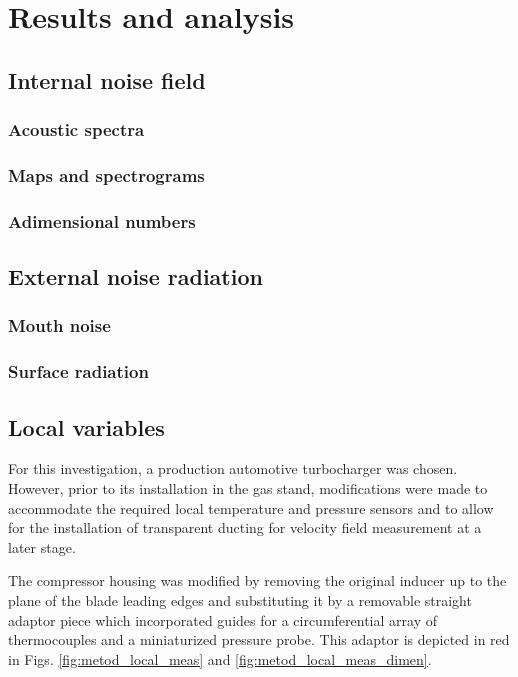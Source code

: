 
\chapter{Results and analysis} \label{cap:results} %

\noindent 

\section{Internal noise field}
\subsection{Acoustic spectra} 
\subsection{Maps and spectrograms}
\subsection{Adimensional numbers}

\section{External noise radiation}
\label{sec:external_results}
\subsection{Mouth noise} 
\subsection{Surface radiation}

\section{Local variables}
\label{sec:local_variables}

For this investigation, a production automotive turbocharger was chosen. However, prior to its installation in the gas stand, modifications were made to accommodate the required local temperature and pressure sensors and to allow for the installation of transparent ducting for velocity field measurement at a later stage.

The compressor housing was modified by removing the original inducer up to the plane of the blade leading edges and substituting it by a removable straight adaptor piece which incorporated guides for a circumferential array of thermocouples and a miniaturized pressure probe. This adaptor is depicted in red in Figs. \ref{fig:metod_local_meas} and \ref{fig:metod_local_meas_dimen}.

